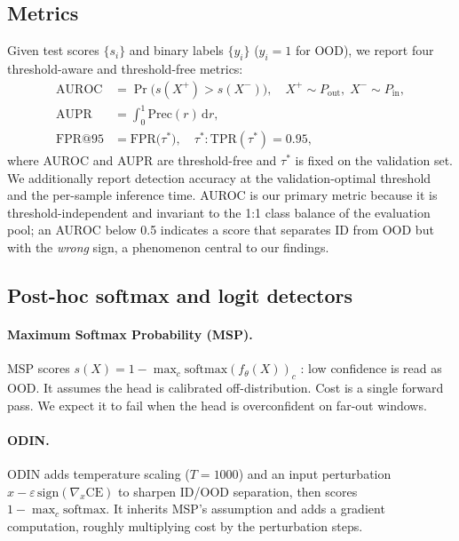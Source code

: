 \documentclass[11pt]{article}
\begin{document}
\subsection{Metrics}\label{sec:metrics}

Given test scores $\{s_i\}$ and binary labels $\{y_i\}$ ($y_i = 1$ for OOD), we
report four threshold-aware and threshold-free metrics:
\begin{align}
\mathrm{AUROC} &= \Pr\big(s(X^{+}) > s(X^{-})\big), \quad X^{+}\!\sim P_{\mathrm{out}},\; X^{-}\!\sim P_{\mathrm{in}}, \\
\mathrm{AUPR}  &= \int_0^1 \mathrm{Prec}(r)\,\mathrm{d}r, \\
\mathrm{FPR@95} &= \mathrm{FPR}\big(\tau^{*}\big), \quad \tau^{*} : \mathrm{TPR}(\tau^{*}) = 0.95,
\end{align}
where AUROC and AUPR are threshold-free and $\tau^{*}$ is fixed on the validation
set. We additionally report detection accuracy at the validation-optimal threshold
and the per-sample inference time. AUROC is our primary metric because it is
threshold-independent and invariant to the 1:1 class balance of the evaluation pool;
an AUROC below \num{0.5} indicates a score that separates ID from OOD but with the
\emph{wrong} sign, a phenomenon central to our findings.

\subsection{Post-hoc softmax and logit detectors}\label{sec:m-posthoc}

\paragraph{Maximum Softmax Probability (MSP).}
MSP scores $s(X) = 1 - \max_c \mathrm{softmax}(f_\theta(X))_c$
\citep{Hendrycks2017}: low confidence is read as OOD. It assumes the head is
calibrated off-distribution. Cost is a single forward pass. We expect it to fail when
the head is overconfident on far-out windows.

\paragraph{ODIN.}
ODIN \citep{Liang2018} adds temperature scaling ($T=1000$) and an input perturbation
$x - \varepsilon\,\mathrm{sign}(\nabla_x \mathrm{CE})$ to sharpen ID/OOD separation,
then scores $1 - \max_c \mathrm{softmax}$. It inherits MSP's assumption and adds a
gradient computation, roughly multiplying cost by the perturbation steps.
\end{document}
